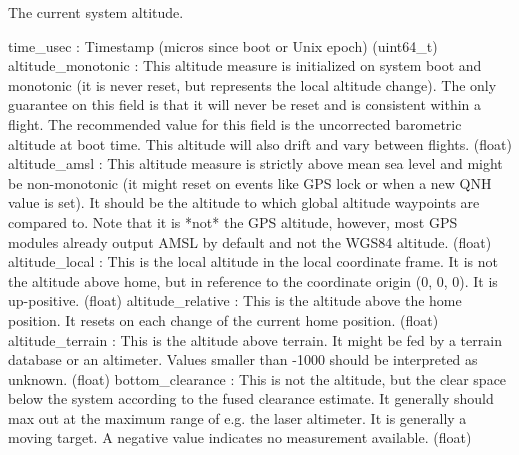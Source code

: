 \begin{DoxyVerb}The current system altitude.

time_usec                 : Timestamp (micros since boot or Unix epoch) (uint64_t)
altitude_monotonic        : This altitude measure is initialized on system boot and monotonic (it is never reset, but represents the local altitude change). The only guarantee on this field is that it will never be reset and is consistent within a flight. The recommended value for this field is the uncorrected barometric altitude at boot time. This altitude will also drift and vary between flights. (float)
altitude_amsl             : This altitude measure is strictly above mean sea level and might be non-monotonic (it might reset on events like GPS lock or when a new QNH value is set). It should be the altitude to which global altitude waypoints are compared to. Note that it is *not* the GPS altitude, however, most GPS modules already output AMSL by default and not the WGS84 altitude. (float)
altitude_local            : This is the local altitude in the local coordinate frame. It is not the altitude above home, but in reference to the coordinate origin (0, 0, 0). It is up-positive. (float)
altitude_relative         : This is the altitude above the home position. It resets on each change of the current home position. (float)
altitude_terrain          : This is the altitude above terrain. It might be fed by a terrain database or an altimeter. Values smaller than -1000 should be interpreted as unknown. (float)
bottom_clearance          : This is not the altitude, but the clear space below the system according to the fused clearance estimate. It generally should max out at the maximum range of e.g. the laser altimeter. It is generally a moving target. A negative value indicates no measurement available. (float)\end{DoxyVerb}
 \mbox{\label{classpymavlink_1_1dialects_1_1v10_1_1MAVLink_a75011d00ef837df3bc28eb22daf9db66}} 
